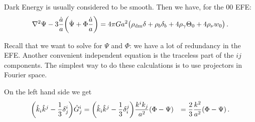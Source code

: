 \documentclass[main.tex]{subfiles}
\begin{document}
Dark Energy is usually considered to be smooth. Then we have, for the 00 EFE: 
%
\begin{align}
\nabla^2 \Psi - 3 \frac{\dot{a}}{a} \qty(\dot{\Psi} + \Phi \frac{\dot{a}}{a }) = 4 \pi G a^2 \qty(
\rho_{\text{dm}} \delta + \rho_{b} \delta_{b} + 4 \rho_{\gamma } \Theta_0 + 4 \rho_{\nu } w_0 
)
\,.
\end{align}

Recall that we want to solve for \(\Psi \) and \(\Phi \): we have a lot of redundancy in the EFE. 
Another convenient independent equation is the traceless part of the \(ij\) components. 
The simplest way to do these calculations is to use projectors in Fourier space.

On the left hand side we get 
%
\begin{align}
\qty(\hat{k}_{i} \hat{k}^{j} - \frac{1}{3} \delta^{i}_{j}) \hat{G}^{i}_{j} &= \qty(\hat{k}_{i} \hat{k}^{j} - \frac{1}{3} \delta_{i}^{j}) 
\frac{k^{i}k_{j}}{a^2} \qty(\Phi - \Psi ) 
&= \frac{2}{3} \frac{k^2}{a^2} \qty(\Phi- \Psi )
\,.
\end{align}
\end{document}
